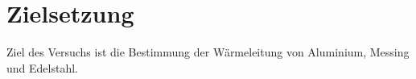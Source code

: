 \section{Zielsetzung}
\label{sec:Zielsetzung}
Ziel des Versuchs ist die Bestimmung der Wärmeleitung von Aluminium, Messing und Edelstahl.